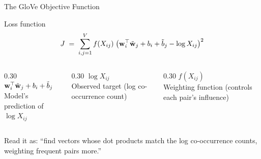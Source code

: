 \documentclass[11pt,aspectratio=169,professionalfonts]{beamer}
\begin{document}
\begin{frame}{The GloVe Objective Function}
  \begin{block}{Loss function}
    \[
      J \;=\; \sum_{i,j=1}^{V} f(X_{ij})\;\bigl(\mathbf{w}_i^\top \tilde{\mathbf{w}}_j + b_i + \tilde{b}_j - \log X_{ij}\bigr)^2
    \]
  \end{block}

  \vspace{6pt}
  \begin{columns}[T]
    \begin{column}{0.30\textwidth}
      \centering
      $\mathbf{w}_i^\top\tilde{\mathbf{w}}_j + b_i + \tilde{b}_j$\\[6pt]
      {\small Model's prediction of $\log X_{ij}$}
    \end{column}
    \begin{column}{0.30\textwidth}
      \centering
      $\log X_{ij}$\\[6pt]
      {\small Observed target (log co-occurrence count)}
    \end{column}
    \begin{column}{0.30\textwidth}
      \centering
      $f(X_{ij})$\\[6pt]
      {\small Weighting function (controls each pair's influence)}
    \end{column}
  \end{columns}

  \vspace{10pt}
  Read it as: ``find vectors whose dot products match the log co-occurrence counts, weighting frequent pairs more.''
\end{frame}
%
%
\end{document}
